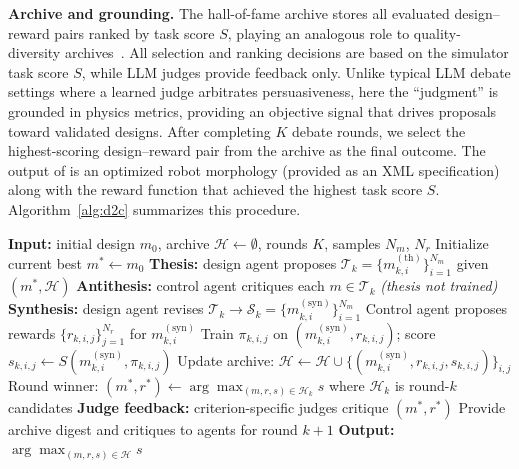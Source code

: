 \textbf{Archive and grounding.} The hall-of-fame archive stores all evaluated design--reward pairs ranked by task score $S$, playing an analogous role to quality-diversity archives~\cite{mouret2015illuminating, pugh2016quality}. All selection and ranking decisions are based on the simulator task score $S$, while LLM judges provide feedback only. Unlike typical LLM debate settings where a learned judge arbitrates persuasiveness, here the ``judgment'' is grounded in physics metrics, providing an objective signal that drives proposals toward validated designs.
After completing $K$ debate rounds, we select the highest-scoring design--reward pair from the archive as the final outcome. The output of \abbrev{} is an optimized robot morphology (provided as an XML specification) along with the reward function that achieved the highest task score $S$. Algorithm~\ref{alg:d2c} summarizes this procedure.


\begin{algorithm}[h]
    \caption{\method{}: Dialectical Co-design Loop.}
    \label{alg:d2c}
    \small
    \begin{algorithmic}[1]
    \STATE \textbf{Input:} initial design $m_0$, archive $\mathcal{H} \leftarrow \emptyset$, rounds $K$, samples $N_m$, $N_r$
    \STATE Initialize current best $m^{\ast} \leftarrow m_0$
    \STATE \textbf{Thesis:} design agent proposes $\mathcal{T}_k = \{m_{k,i}^{(\mathrm{th})}\}_{i=1}^{N_m}$ given $(m^{\ast}, \mathcal{H})$
    \STATE \textbf{Antithesis:} control agent critiques each $m \in \mathcal{T}_k$ \hfill \textit{(thesis not trained)}
    \STATE \textbf{Synthesis:} design agent revises $\mathcal{T}_k \to \mathcal{S}_k = \{m_{k,i}^{(\mathrm{syn})}\}_{i=1}^{N_m}$
        \STATE Control agent proposes rewards $\{r_{k,i,j}\}_{j=1}^{N_r}$ for $m_{k,i}^{(\mathrm{syn})}$
            \STATE Train $\pi_{k,i,j}$ on $(m_{k,i}^{(\mathrm{syn})}, r_{k,i,j})$; score $s_{k,i,j} \leftarrow S(m_{k,i}^{(\mathrm{syn})}, \pi_{k,i,j})$
        \ENDFOR
    \ENDFOR
    \STATE Update archive: $\mathcal{H} \leftarrow \mathcal{H} \cup \{(m_{k,i}^{(\mathrm{syn})}, r_{k,i,j}, s_{k,i,j})\}_{i,j}$
    \STATE Round winner: $(m^{\ast}, r^{\ast}) \leftarrow \arg\max_{(m,r,s) \in \mathcal{H}_k} s$ where $\mathcal{H}_k$ is round-$k$ candidates
    \STATE \textbf{Judge feedback:} criterion-specific judges critique $(m^{\ast}, r^{\ast})$
    \STATE Provide archive digest and critiques to agents for round $k{+}1$
    \ENDFOR
    \STATE \textbf{Output:} $\arg\max_{(m, r, s) \in \mathcal{H}} s$
    \end{algorithmic}
\end{algorithm}
